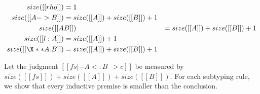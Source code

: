 \begin{definition}
  \begin{align*}
    size([[ rho ]]) &= 1 \\
    size([[ A -> B ]]) &= size([[A]]) + size([[B]]) + 1 \\
    size([[ A & B ]]) &= size([[A]]) + size([[B]]) + 1 \\
    size([[ {l:A} ]]) &= size([[A]]) + 1 \\
    size([[ \X ** A. B ]]) &= size([[A]]) + size([[B]]) + 1
  \end{align*}
\end{definition}

\decidesub*
\proof
Let the judgment $[[fs |- A <: B ~~> c]]$ be measured by $size([[fs]]) +
size([[A]]) + size([[B]])$. For each subtyping rule, we show that every
inductive premise
is smaller than the conclusion.

